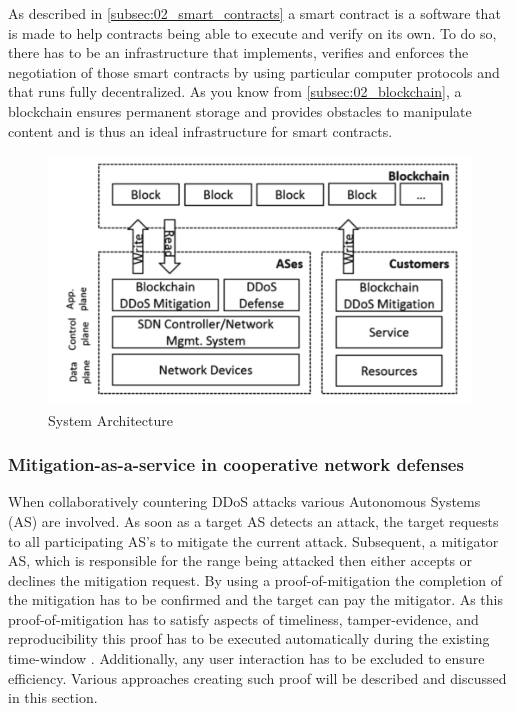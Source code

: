 As described in \ref{subsec:02_smart_contracts} a smart contract is a software that is made to help contracts being able to execute and verify on its own. To do so, there has to be an infrastructure that implements, verifies and enforces the negotiation of those smart contracts by using particular computer protocols and that runs fully decentralized. As you know from \ref{subsec:02_blockchain}, a blockchain ensures permanent storage and provides obstacles to manipulate content and is thus an ideal infrastructure for smart contracts.

\begin{figure}[ht]
  \begin{center}
  \includegraphics[scale=0.6]{Talk7/img/ddos/collaborative_ddos_mitigation_system_architecture}
  \end{center}
  \caption{System Architecture}
  \label{system_architecture}
\end{figure}



\subsubsection{Mitigation-as-a-service in cooperative network defenses}
When collaboratively countering DDoS attacks various Autonomous Systems (AS) are involved. As soon as a target AS detects an attack, the target requests to all participating AS's to mitigate the current attack. Subsequent, a mitigator AS, which is responsible for the range being attacked then either accepts or declines the mitigation request. By using a proof-of-mitigation the completion of the mitigation has to be confirmed and the target can pay the mitigator. As this proof-of-mitigation has to satisfy aspects of timeliness, tamper-evidence, and reproducibility this proof has to be executed automatically during the existing time-window \cite{Mannhart2018}. Additionally, any user interaction has to be excluded to ensure efficiency. Various approaches creating such proof will be described and discussed in this section.

